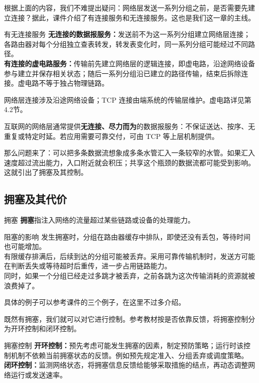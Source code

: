 根据上面的内容，我们不难提出疑问：网络层发送一系列分组之前，是否需要先建立连接？据此，课件介绍了有连接服务和无连接服务。这也是我们这一章的主线。

\begin{definition}{有无连接服务}
\textbf{无连接的数据报服务：}发送前不为这一系列分组建立网络层连接；各路由器对每个分组独立查表转发，转发表变化时，同一系列分组可能经过不同路径。\\
\textbf{有连接的虚电路服务：}传输前先建立网络层的逻辑连接，即虚电路，沿途网络设备参与建立并保存相关状态；随后一系列分组沿已建立的路径传输，结束后拆除连接。虚电路不等于独占物理链路。
\end{definition}

网络层连接涉及沿途网络设备；TCP 连接由端系统的传输层维护。虚电路详见第4.2节。

互联网的网络层通常提供\textbf{无连接、尽力而为}的数据报服务：不保证送达、按序、无重复或特定时延。若应用需要可靠交付，可由 TCP 等上层机制提供。

那么问题来了：可以把多条数据流想象成多条水管汇入一条较窄的水管。如果汇入速度超过流出能力，入口附近就会积压；共享这个瓶颈的数据流都可能受到影响。这就引出了拥塞及其控制。

\subsection{拥塞及其代价}
\begin{definition}{拥塞}
\textbf{拥塞}指注入网络的流量超过某些链路或设备的处理能力。
\end{definition}

\begin{proposition}{阻塞的影响}
发生拥塞时，分组在路由器缓存中排队，即使还没有丢包，等待时间也可能增加。\\
有限缓存排满后，后续到达的分组可能被丢弃。采用可靠传输机制时，发送方可能在判断丢失或等待超时后重传，进一步占用链路能力。\\
同时，如果一个分组已经走过多跳才被丢弃，之前各跳为这次传输消耗的资源就被浪费掉了。
\end{proposition}

具体的例子可以参考课件的三个例子，在这里不过多介绍。

既然有拥塞，我们就可以对它进行控制。参考教材按是否依靠反馈，将拥塞控制分为开环控制和闭环控制。

\begin{proposition}{拥塞控制}
\textbf{开环控制：}预先考虑可能发生拥塞的因素，制定预防策略；运行时该控制机制不依赖当前拥塞状态的反馈。例如预先规定准入、分组丢弃或调度策略。\\
\textbf{闭环控制：}监测网络状态，将拥塞信息反馈给能够采取措施的结点，再动态调整网络运行或发送速率。
\end{proposition}

